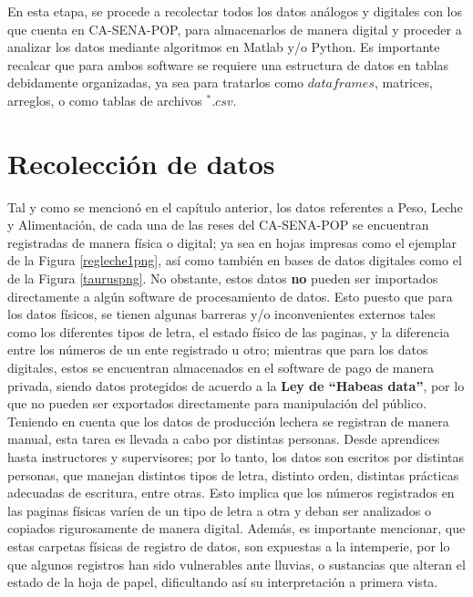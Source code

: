 
En esta etapa, se procede a recolectar todos los datos análogos y digitales con los que cuenta en CA-SENA-POP, para almacenarlos de manera digital y proceder a analizar los datos mediante algoritmos en Matlab y/o Python. Es importante recalcar que para ambos software se requiere una estructura de datos en tablas debidamente organizadas, ya sea para tratarlos como $dataframes$, matrices, arreglos, o como tablas de archivos $^{*}.csv$.

\section{Recolección de datos} \label{datarecol}

Tal y como se mencionó en el capítulo anterior, los datos referentes a Peso, Leche y Alimentación, de cada una de las reses del CA-SENA-POP se encuentran registradas de manera física o digital; ya sea en hojas impresas como el ejemplar de la Figura \ref{regleche1png}, así como también en bases de datos digitales como el de la Figura \ref{tauruspng}. No obstante, estos datos \textbf{no} pueden ser importados directamente a algún software de procesamiento de datos. Esto puesto que para los datos físicos, se tienen algunas barreras y/o inconvenientes externos tales como los diferentes tipos de letra,  el estado físico de las paginas, y la diferencia entre los números de un ente registrado u otro; mientras que para los datos digitales, estos se encuentran almacenados en el software de pago de manera privada, siendo datos protegidos de acuerdo a la \textbf{Ley de ``Habeas data''}, por lo que no pueden ser exportados directamente para manipulación del público.\\ %

Teniendo en cuenta que los datos de producción lechera se registran de manera manual, esta tarea es llevada a cabo por distintas personas. Desde aprendices hasta instructores y supervisores; por lo tanto, los datos son escritos por distintas personas, que manejan distintos tipos de letra, distinto orden, distintas prácticas adecuadas de escritura, entre otras. Esto implica que los números registrados en las paginas físicas varíen de un tipo de letra a otra y deban ser analizados o copiados rigurosamente de manera digital. Además, es importante mencionar, que estas carpetas físicas de registro de datos, son expuestas a la intemperie, por lo que algunos registros han sido vulnerables ante lluvias, o sustancias que alteran el estado de la hoja de papel, dificultando así su interpretación a primera vista.\\

